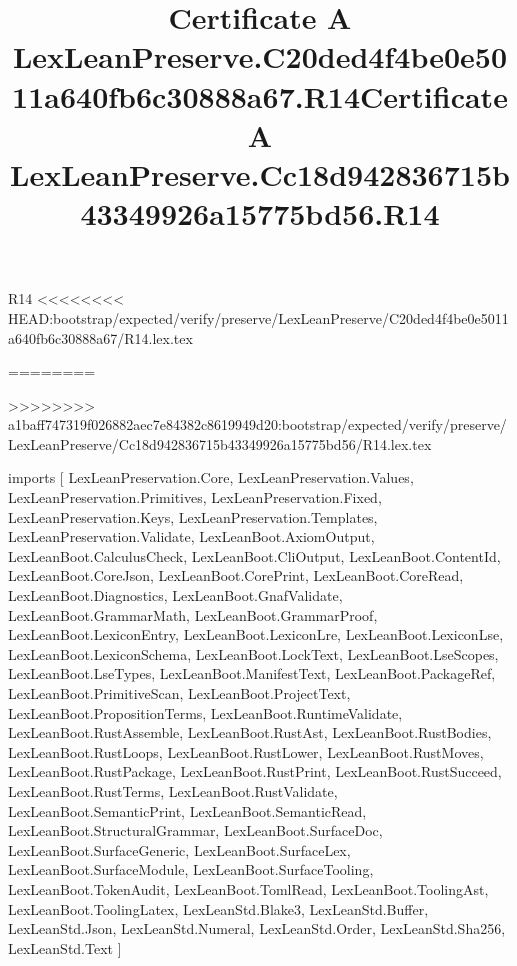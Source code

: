 \begin{lexlean}{R14}
<<<<<<<< HEAD:bootstrap/expected/verify/preserve/LexLeanPreserve/C20ded4f4be0e5011a640fb6c30888a67/R14.lex.tex
\title{Certificate A LexLeanPreserve.C20ded4f4be0e5011a640fb6c30888a67.R14}
========
\title{Certificate A LexLeanPreserve.Cc18d942836715b43349926a15775bd56.R14}
>>>>>>>> a1baff747319f026882aec7e84382c8619949d20:bootstrap/expected/verify/preserve/LexLeanPreserve/Cc18d942836715b43349926a15775bd56/R14.lex.tex
\begin{coremodule}
imports [
  LexLeanPreservation.Core,
  LexLeanPreservation.Values,
  LexLeanPreservation.Primitives,
  LexLeanPreservation.Fixed,
  LexLeanPreservation.Keys,
  LexLeanPreservation.Templates,
  LexLeanPreservation.Validate,
  LexLeanBoot.AxiomOutput,
  LexLeanBoot.CalculusCheck,
  LexLeanBoot.CliOutput,
  LexLeanBoot.ContentId,
  LexLeanBoot.CoreJson,
  LexLeanBoot.CorePrint,
  LexLeanBoot.CoreRead,
  LexLeanBoot.Diagnostics,
  LexLeanBoot.GnafValidate,
  LexLeanBoot.GrammarMath,
  LexLeanBoot.GrammarProof,
  LexLeanBoot.LexiconEntry,
  LexLeanBoot.LexiconLre,
  LexLeanBoot.LexiconLse,
  LexLeanBoot.LexiconSchema,
  LexLeanBoot.LockText,
  LexLeanBoot.LseScopes,
  LexLeanBoot.LseTypes,
  LexLeanBoot.ManifestText,
  LexLeanBoot.PackageRef,
  LexLeanBoot.PrimitiveScan,
  LexLeanBoot.ProjectText,
  LexLeanBoot.PropositionTerms,
  LexLeanBoot.RuntimeValidate,
  LexLeanBoot.RustAssemble,
  LexLeanBoot.RustAst,
  LexLeanBoot.RustBodies,
  LexLeanBoot.RustLoops,
  LexLeanBoot.RustLower,
  LexLeanBoot.RustMoves,
  LexLeanBoot.RustPackage,
  LexLeanBoot.RustPrint,
  LexLeanBoot.RustSucceed,
  LexLeanBoot.RustTerms,
  LexLeanBoot.RustValidate,
  LexLeanBoot.SemanticPrint,
  LexLeanBoot.SemanticRead,
  LexLeanBoot.StructuralGrammar,
  LexLeanBoot.SurfaceDoc,
  LexLeanBoot.SurfaceGeneric,
  LexLeanBoot.SurfaceLex,
  LexLeanBoot.SurfaceModule,
  LexLeanBoot.SurfaceTooling,
  LexLeanBoot.TokenAudit,
  LexLeanBoot.TomlRead,
  LexLeanBoot.ToolingAst,
  LexLeanBoot.ToolingLatex,
  LexLeanStd.Blake3,
  LexLeanStd.Buffer,
  LexLeanStd.Json,
  LexLeanStd.Numeral,
  LexLeanStd.Order,
  LexLeanStd.Sha256,
  LexLeanStd.Text
]


\end{coremodule}
\end{lexlean}

